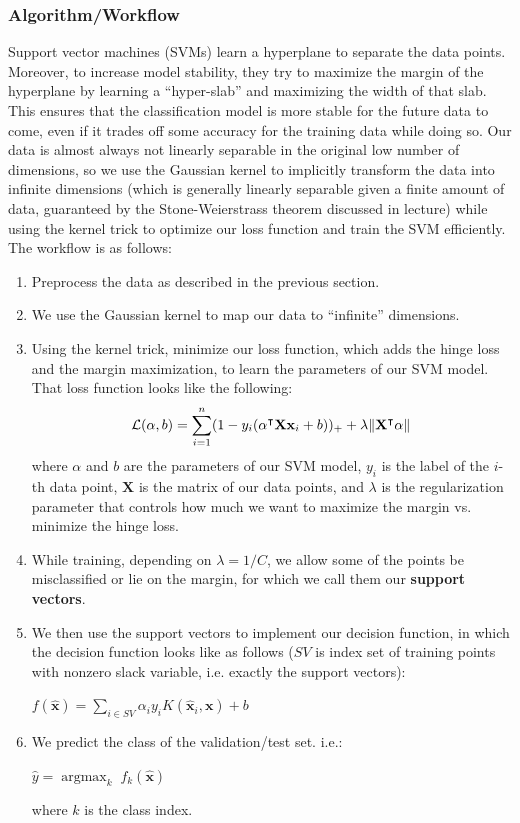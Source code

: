 \documentclass[10pt]{article} %
\begin{document}
\subsubsection{Algorithm/Workflow}
Support vector machines (SVMs)  learn a hyperplane to separate the data points. Moreover, to increase model stability, they try to maximize the margin of the hyperplane by learning a ``hyper-slab'' and maximizing the width of that slab. This ensures that the classification model is more stable for the future data to come, even if it trades off some accuracy for the training data while doing so. Our data is almost always not linearly separable in the original low number of dimensions, so we use the Gaussian kernel to implicitly transform the data into infinite dimensions (which is generally linearly separable given a finite amount of data, guaranteed by the Stone-Weierstrass theorem discussed in lecture) while using the kernel trick to optimize our loss function and train the SVM efficiently. The workflow is as follows:
\begin{enumerate}
  \item Preprocess the data as described in the previous section.
  \item We use the Gaussian kernel to map our data to ``infinite'' dimensions.
  \item Using the kernel trick, minimize our loss function, which adds the hinge loss and the margin maximization, to learn the parameters of our SVM model. That loss function looks like the following:
    \[\mathcal{L}(\mathbf{\alpha}, b) = \sum_{i=1}^{n}(1-y_i(\mathbf{\alpha^\intercal X x}_i + b))_+ +  \lambda \norm{\mathbf{X^\intercal \alpha}} \] where $\alpha$ and $b$ are the parameters of our SVM model, $y_i$ is the label of the $i$-th data point, $\mathbf{X}$ is the matrix of our data points, and $\lambda$ is the regularization parameter that controls how much we want to maximize the margin vs. minimize the hinge loss.
  \item While training, depending on $\lambda = 1/C$, we allow some of the points be misclassified or lie on the margin, for which we call them our \textbf{support vectors}.
  \item We then use the support vectors to implement our decision function, in which the decision function looks like as follows ($SV$ is index set of training points with nonzero slack variable, i.e. exactly the support vectors):
    \begin{center}
      \(f(\mathbf{\hat x}) = \sum_{i \in SV} \alpha_i y_i K(\mathbf{\hat x}_i, \mathbf{x}) + b\)
    \end{center}
  \item We predict the class of the validation/test set. i.e.:
    \begin{center}
      \(\hat{y} = \operatorname{argmax}_{k} \; f_k(\mathbf{\hat x})\)
    \end{center} where $k$ is the class index.
\end{enumerate}
\end{document}
